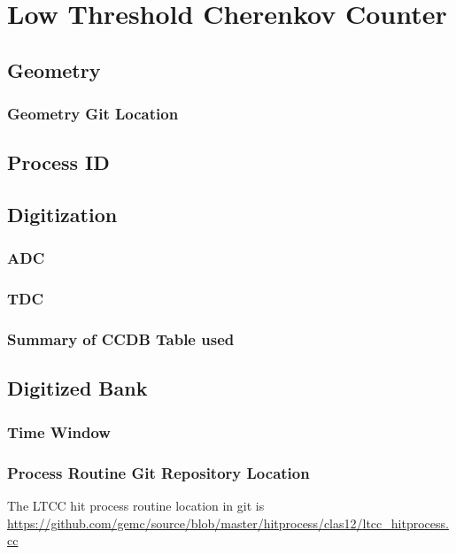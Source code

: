 \section{Low Threshold Cherenkov Counter}


\subsection{Geometry}

\subsubsection{Geometry Git Location}

\subsection{Process ID}

\subsection{Digitization}


\subsubsection{ADC}
\subsubsection{TDC}

\subsubsection{Summary of CCDB Table used}

\subsection{Digitized Bank}

\subsubsection{Time Window}

\subsubsection{Process Routine Git Repository Location}


The LTCC hit process routine location in git is \url{https://github.com/gemc/source/blob/master/hitprocess/clas12/ltcc_hitprocess.cc}
